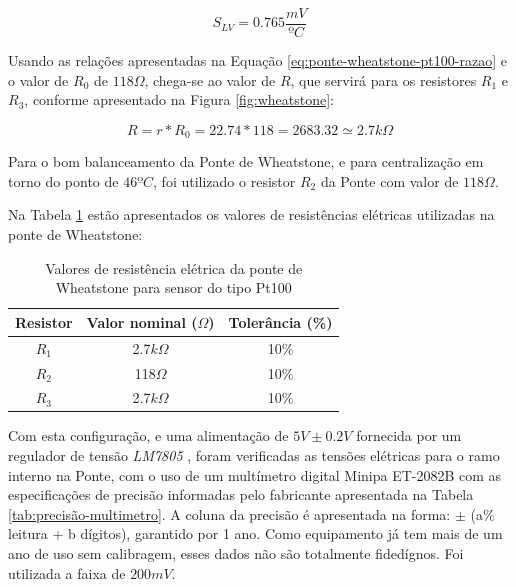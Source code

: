 \documentclass[a4paper]{instrumentacao}
\begin{document}
\begin{equation}
	S_{LV}=0.765 \frac{mV}{ºC}
	\label{eq:ponte-wheatstone-pt100-sensibilidade-valor}
\end{equation} 

Usando as relações apresentadas na Equação \ref{eq:ponte-wheatstone-pt100-razao} e o valor de $R_0$ de $118 \Omega$, chega-se ao valor de $R$, que servirá para os resistores $R_1$ e $R_3$, conforme apresentado na Figura \ref{fig:wheatstone}:

\begin{equation}
	R = r * R_0 = 22.74 * 118 = 2683.32 \simeq 2.7 k\Omega 
	\label{eq:ponte-wheatstone-pt100-razao-valor}
\end{equation} 

Para o bom balanceamento da Ponte de Wheatstone, e para centralização em torno do ponto de $46ºC$, foi utilizado o resistor $R_2$ da Ponte com valor de $118\Omega$.

Na Tabela \ref{tab:pt100-ponte-resistores} estão apresentados os valores de resistências elétricas utilizadas na ponte de Wheatstone:

\begin{table}[H]
\centering
\caption{Valores de resistência elétrica da ponte de Wheatstone para sensor do tipo Pt100}
\label{tab:pt100-ponte-resistores}
\begin{tabular}{|c|c|c|}
\hline
	\textbf{Resistor} 	& \textbf{Valor nominal ($\Omega$)} 	& \textbf{Tolerância (\%)} 	\\ \hline
	$R_1$				& 2.7$k\Omega$									& 10\%								\\ \hline
	$R_2$				& 118$\Omega$									& 10\%								\\ \hline
	$R_3$				& 2.7$k\Omega$									& 10\%								\\ \hline
\end{tabular}
\end{table}

Com esta configuração, e uma alimentação de $5V \pm 0.2V$ fornecida por um regulador de tensão \textit{LM7805} \cite{datasheet-lm7805}, foram verificadas as tensões elétricas para o ramo interno na Ponte, com o uso de um multímetro digital Minipa ET-2082B com as especificações de precisão informadas pelo fabricante apresentada na Tabela \ref{tab:precisão-multimetro}. A coluna da precisão é apresentada na forma: $\pm$ (a$\%$ leitura + b dígitos), garantido por 1 ano. Como equipamento já tem mais de um ano de uso sem calibragem, esses dados não são totalmente fidedígnos. Foi utilizada a faixa de $200 mV$.
\end{document}
